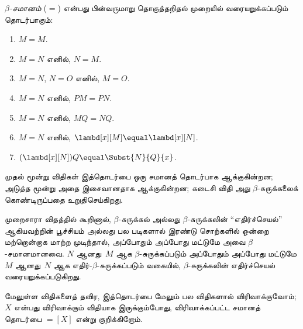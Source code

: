 \documentclass[../../../include/open-logic-section]{subfiles}
\begin{document}
\begin{defn}
  \emph{$\beta$-சமானம்} ($\equal$) என்பது பின்வருமாறு தொகுத்தறிதல் முறையில்
  வரையறுக்கப்படும் தொடர்பாகும்:
  \begin{enumerate}
  \item $M \equal M$.
  \item $M \equal N$ எனில், $N \equal M$.
  \item $M \equal N$, $N \equal O$ எனில், $M \equal O$.
  \item $M \equal N$ எனில், $PM \equal PN$.
  \item $M \equal N$ எனில், $MQ \equal NQ$.
  \item $M \equal N$ எனில், $\lambd[x][M] \equal \lambd[x][N]$.
  \item $(\lambd[x][N])Q \equal \Subst{N}{Q}{x}$.
  \end{enumerate}
\end{defn}

முதல் மூன்று விதிகள் இத்தொடர்பை ஒரு சமானத் தொடர்பாக ஆக்குகின்றன; அடுத்த
மூன்று அதை இசைவானதாக ஆக்குகின்றன; கடைசி விதி அது $\beta$-சுருக்கலைக்
கொண்டிருப்பதை உறுதிசெய்கிறது.

முறைசாரா விதத்தில் கூறினால், $\beta$-சுருக்கல் அல்லது
$\beta$-சுருக்கலின் “எதிர்ச்செயல்” ஆகியவற்றின் பூச்சியம் அல்லது பல படிகளால்
இரண்டு சொற்களில் ஒன்றை மற்றொன்றாக மாற்ற முடிந்தால், அப்போதும் அப்போது மட்டுமே
அவை $\beta$-சமானமானவை. $N$ ஆனது~$M$ ஆக $\beta$-சுருக்கப்படும் அப்போதும்
அப்போது மட்டுமே $M$ ஆனது~$N$ ஆக எதிர்-$\beta$-சுருக்கப்படும் வகையில்,
$\beta$-சுருக்கலின் எதிர்ச்செயல் வரையறுக்கப்படுகிறது.

மேலுள்ள விதிகளைத் தவிர, இத்தொடர்பை மேலும் பல விதிகளால் விரிவாக்குவோம்;
$X$ என்பது விரிவாக்கும் விதியாக இருக்கும்போது, விரிவாக்கப்பட்ட சமானத் தொடர்பை
$\equal[X]$ என்று குறிக்கிறோம்.
\end{document}
